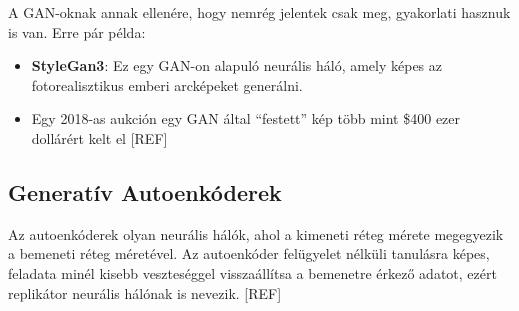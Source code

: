 

A GAN-oknak annak ellenére, hogy nemrég jelentek csak meg, gyakorlati hasznuk is van. Erre pár példa:
\begin{itemize}
	\item \textbf{StyleGan3}: Ez egy GAN-on alapuló neurális háló, amely képes az fotorealisztikus emberi arcképeket generálni. \cite{stylegan3}
	\item Egy 2018-as aukción egy GAN által ``festett'' kép több mint \$400 ezer dollárért kelt el [REF]
\end{itemize}

\subsection{Generatív Autoenkóderek}

Az autoenkóderek olyan neurális hálók, ahol a kimeneti réteg mérete megegyezik a bemeneti réteg méretével. Az autoenkóder felügyelet nélküli tanulásra képes, feladata minél kisebb veszteséggel visszaállítsa a bemenetre érkező adatot, ezért replikátor neurális hálónak is nevezik. [REF]

